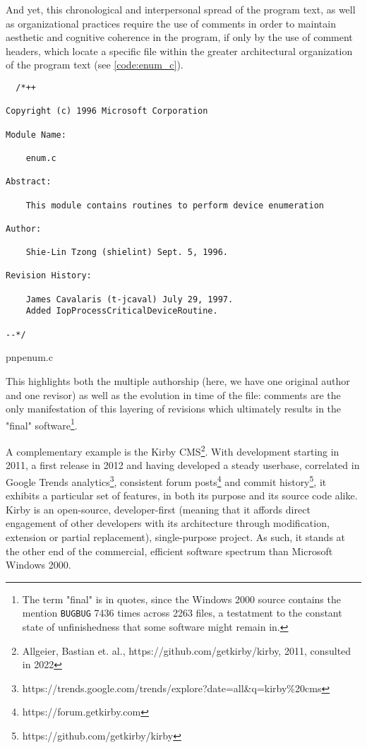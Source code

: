 And yet, this chronological and interpersonal spread of the program text, as well as organizational practices require the use of comments in order to maintain aesthetic and cognitive coherence in the program, if only by the use of comment headers, which locate a specific file within the greater architectural organization of the program text (see \ref{code:enum_c}).

\begin{listing}
  \begin{verbatim}
  /*++

Copyright (c) 1996 Microsoft Corporation

Module Name:

    enum.c

Abstract:

    This module contains routines to perform device enumeration

Author:

    Shie-Lin Tzong (shielint) Sept. 5, 1996.

Revision History:

    James Cavalaris (t-jcaval) July 29, 1997.
    Added IopProcessCriticalDeviceRoutine.

--*/
\end{verbatim}
  \caption{pnpenum.c}
  \label{code:enum_c}
\end{listing}


This highlights both the multiple authorship (here, we have one original author and one revisor) as well as the evolution in time of the file: comments are the only manifestation of this layering of revisions which ultimately results in the "final" software\footnote{The term "final" is in quotes, since the Windows 2000 source contains the mention \lstinline{BUGBUG} 7436 times across 2263 files, a testatment to the constant state of unfinishedness that some software might remain in.}.

A complementary example is the Kirby CMS\footnote{Allgeier, Bastian et. al., https://github.com/getkirby/kirby, 2011, consulted in 2022}. With development starting in 2011, a first release in 2012 and having developed a steady userbase, correlated in Google Trends analytics\footnote{https://trends.google.com/trends/explore?date=all\&q=kirby\%20cms}, consistent forum posts\footnote{https://forum.getkirby.com} and commit history\footnote{https://github.com/getkirby/kirby}, it exhibits a particular set of features, in both its purpose and its source code alike. Kirby is an open-source, developer-first (meaning that it affords direct engagement of other developers with its architecture through modification, extension or partial replacement), single-purpose project. As such, it stands at the other end of the commercial, efficient software spectrum than Microsoft Windows 2000.

